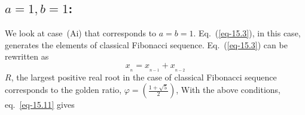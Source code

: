 \begin{multicols}{2}




\section{\underline{$a=1, b =1$}:}\label{section-16}
We look at case~(Ai) that corresponds to $a = b = 1$. Eq.~(\ref{eq-15.3}), in this case, generates the elements of classical Fibonacci sequence. Eq.~(\ref{eq-15.3}) can be rewritten as
\begin{equation}
x_{_n} = x_{_{n-1}} + x_{_{n-2}}\label{eq-16.1}
\end{equation}
$R$, the largest positive real root in the case of classical Fibonacci sequence corresponds to the golden ratio, $\varphi = \displaystyle{\left(\frac{1+\sqrt5}{2}\right)}$,
With the above conditions, eq.~\ref{eq-15.11} gives

\vspace{-.6cm}


\end{multicols}

